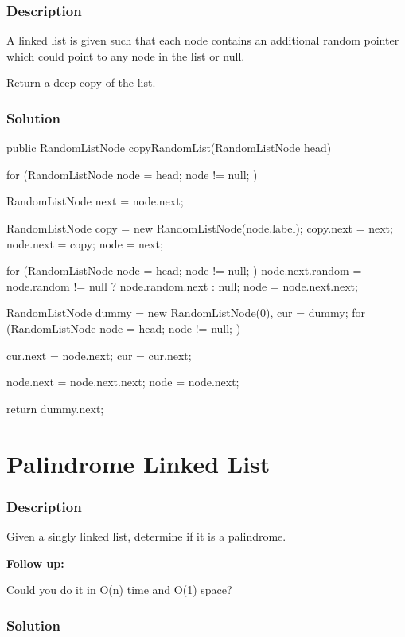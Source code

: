 \subsubsection{Description}
A linked list is given such that each node contains an additional random pointer which could point to any node in the list or null.

Return a deep copy of the list.
\subsubsection{Solution}

\begin{Code}
public RandomListNode copyRandomList(RandomListNode head) {
    for (RandomListNode node = head; node != null; ) {
        RandomListNode next = node.next;

        RandomListNode copy = new RandomListNode(node.label);
        copy.next = next;
        node.next = copy;
        node = next;
    }

    for (RandomListNode node = head; node != null; ) {
        node.next.random = node.random != null ? node.random.next : null;
        node = node.next.next;
    }

    RandomListNode dummy = new RandomListNode(0), cur = dummy;
    for (RandomListNode node = head; node != null; ) {
        cur.next = node.next;
        cur = cur.next;

        node.next = node.next.next;
        node = node.next;
    }

    return dummy.next;
}
\end{Code}

\newpage

\section{Palindrome Linked List} %

\subsubsection{Description}
Given a singly linked list, determine if it is a palindrome.

\textbf{Follow up:}

Could you do it in O(n) time and O(1) space?

\subsubsection{Solution}

